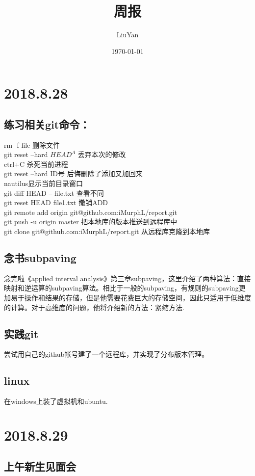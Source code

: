 \documentclass[UTF8]{ctexart}
\title{周报}
\author{LiuYan}
\date{\today}
\begin{document}
\tableofcontents
\maketitle
\section{2018.8.28}
\subsection{练习相关git命令：}
rm -f file 删除文件\\
git reset --hard $HEAD^{\Lambda}$  丢弃本次的修改\\
ctrl+C 杀死当前进程\\
git reset --hard ID号  后悔删除了添加又加回来\\
nautilus显示当前目录窗口\\
git diff HEAD -- file.txt  查看不同\\
git reset HEAD file1.txt 撤销ADD\\
git remote add origin git@github.com:iMurphL/report.git\\
git push -u origin master 把本地库的版本推送到远程库中\\
git clone git@github.com:iMurphL/report.git 从远程库克隆到本地库\\
\subsection{念书subpaving}
念完啦《applied interval analysis》第三章subpaving，这里介绍了两种算法：直接映射和逆运算的subpaving算法。相比于一般的subpaving，有规则的subpaving更加易于操作和结果的存储，但是他需要花费巨大的存储空间，因此只适用于低维度的计算。对于高维度的问题，他将介绍新的方法：紧缩方法.\\
\subsection{实践git}
尝试用自己的github帐号建了一个远程库，并实现了分布版本管理。
\subsection{linux}
在windows上装了虚拟机和ubuntu.

\section{2018.8.29}
\subsection{上午新生见面会}
\end{document}
